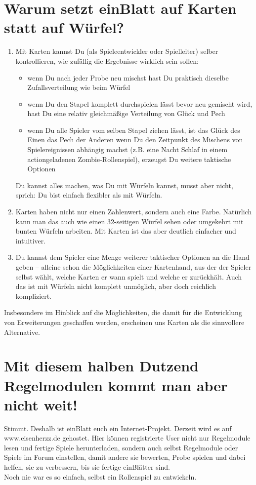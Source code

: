 \section{Warum setzt einBlatt auf Karten statt auf Würfel?}
\begin{enumerate}
\item Mit Karten kannst Du (als Spieleentwickler oder Spielleiter) selber kontrollieren, wie zufällig die Ergebnisse wirklich sein sollen:
\begin{itemize}
\item wenn Du nach jeder Probe neu mischst hast Du praktisch dieselbe Zufallsverteilung wie beim Würfel
\item wenn Du den Stapel komplett durchspielen lässt bevor neu gemischt wird, hast Du eine relativ gleichmäßige Verteilung von Glück und Pech
\item wenn Du alle Spieler vom selben Stapel ziehen lässt, ist das Glück des Einen das Pech der Anderen wenn Du den Zeitpunkt des Mischens von Spielereignissen abhängig machst (z.B. eine Nacht Schlaf in einem actiongeladenen Zombie-Rollenspiel), erzeugst Du weitere taktische Optionen
\end{itemize}      
Du kannst alles machen, was Du mit Würfeln kannst, musst aber nicht, sprich: Du bist einfach flexibler als mit Würfeln.
\item Karten haben nicht nur einen Zahlenwert, sondern auch eine Farbe. Natürlich kann man das auch wie einen 32-seitigen Würfel sehen oder umgekehrt mit bunten Würfeln arbeiten. Mit Karten ist das aber deutlich einfacher und intuitiver.
\item Du kannst dem Spieler eine Menge weiterer taktischer Optionen an die Hand geben -- alleine schon die Möglichkeiten einer Kartenhand, aus der der Spieler selbst wählt, welche Karten er wann spielt und welche er zurückhält. Auch das ist mit Würfeln nicht komplett unmöglich, aber doch reichlich kompliziert.
\end{enumerate}
Insbesondere im Hinblick auf die Möglichkeiten, die damit für die Entwicklung von Erweiterungen geschaffen werden, erscheinen uns Karten als die sinnvollere Alternative.

\section {Mit diesem halben Dutzend Regelmodulen kommt man aber nicht weit!}
Stimmt. Deshalb ist einBlatt euch ein Internet-Projekt. Derzeit wird es auf www.eisenherzz.de gehostet. Hier können registrierte User nicht nur Regelmodule lesen und fertige Spiele herunterladen, sondern auch selbst Regelmodule oder Spiele im Forum einstellen, damit andere sie bewerten, Probe spielen und dabei helfen, sie zu verbessern, bis sie fertige einBlätter sind.
\\
Noch nie war es so einfach, selbst ein Rollenspiel zu entwickeln.

